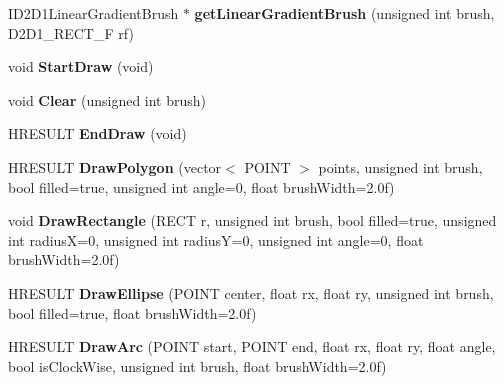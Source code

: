 \begin{DoxyCompactItemize}
\item 
\hypertarget{class_engine_render_d2_d_ac0df98ea121f6aabcfa043f19c983b32}{I\-D2\-D1\-Linear\-Gradient\-Brush $\ast$ {\bfseries get\-Linear\-Gradient\-Brush} (unsigned int brush, D2\-D1\-\_\-\-R\-E\-C\-T\-\_\-\-F rf)}\label{class_engine_render_d2_d_ac0df98ea121f6aabcfa043f19c983b32}

\item 
\hypertarget{class_engine_render_d2_d_ab0bf3bdaa14f39a02d28755f6cc75438}{void {\bfseries Start\-Draw} (void)}\label{class_engine_render_d2_d_ab0bf3bdaa14f39a02d28755f6cc75438}

\item 
\hypertarget{class_engine_render_d2_d_ab7e675bc41b33a614b2caf94f828c957}{void {\bfseries Clear} (unsigned int brush)}\label{class_engine_render_d2_d_ab7e675bc41b33a614b2caf94f828c957}

\item 
\hypertarget{class_engine_render_d2_d_a847ae770e8a4f4d054d5d4e336c4db62}{H\-R\-E\-S\-U\-L\-T {\bfseries End\-Draw} (void)}\label{class_engine_render_d2_d_a847ae770e8a4f4d054d5d4e336c4db62}

\item 
\hypertarget{class_engine_render_d2_d_a53738f7c724e5eef8ef953c31089241a}{H\-R\-E\-S\-U\-L\-T {\bfseries Draw\-Polygon} (vector$<$ P\-O\-I\-N\-T $>$ points, unsigned int brush, bool filled=true, unsigned int angle=0, float brush\-Width=2.\-0f)}\label{class_engine_render_d2_d_a53738f7c724e5eef8ef953c31089241a}

\item 
\hypertarget{class_engine_render_d2_d_abe84d7b4f643e9fec9cb3bc7d26e7c8d}{void {\bfseries Draw\-Rectangle} (R\-E\-C\-T r, unsigned int brush, bool filled=true, unsigned int radius\-X=0, unsigned int radius\-Y=0, unsigned int angle=0, float brush\-Width=2.\-0f)}\label{class_engine_render_d2_d_abe84d7b4f643e9fec9cb3bc7d26e7c8d}

\item 
\hypertarget{class_engine_render_d2_d_a724b48a6f1ecd1f9288513efb86200d5}{H\-R\-E\-S\-U\-L\-T {\bfseries Draw\-Ellipse} (P\-O\-I\-N\-T center, float rx, float ry, unsigned int brush, bool filled=true, float brush\-Width=2.\-0f)}\label{class_engine_render_d2_d_a724b48a6f1ecd1f9288513efb86200d5}

\item 
\hypertarget{class_engine_render_d2_d_a01eab9c4d19e537057429fa4422dc50b}{H\-R\-E\-S\-U\-L\-T {\bfseries Draw\-Arc} (P\-O\-I\-N\-T start, P\-O\-I\-N\-T end, float rx, float ry, float angle, bool is\-Clock\-Wise, unsigned int brush, float brush\-Width=2.\-0f)}\label{class_engine_render_d2_d_a01eab9c4d19e537057429fa4422dc50b}


\end{DoxyCompactItemize}

